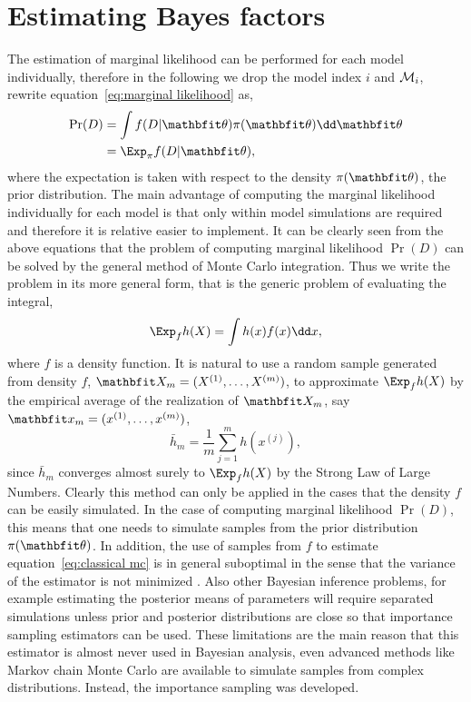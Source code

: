 \section{Estimating Bayes factors}
\label{sec:Estimating Bayes factors}

The estimation of marginal likelihood can be performed for each model
individually, therefore in the following we drop the model index $i$ and
$\mathcal{M}_i$, rewrite equation~\eqref{eq:marginal likelihood} as,
\begin{align}
  \Pr(D) & = \int f(D|\bth)\pi(\bth)\dd\bth \\
  & = \Exp_{\pi} f(D|\bth),
\end{align}
where the expectation is taken with respect to the density $\pi(\bth)$, the
prior distribution. The main advantage of computing the marginal likelihood
individually for each model is that only within model simulations are required
and therefore it is relative easier to implement. It can be clearly seen from
the above equations that the problem of computing marginal likelihood $\Pr(D)$
can be solved by the general method of Monte Carlo integration. Thus we write
the problem in its more general form, that is the generic problem of
evaluating the integral,
\begin{equation}
  \Exp_f h(X) = \int h(x) f(x)
  \dd x,
  \label{eq:classical mc}
\end{equation}
where $f$ is a density function. It is natural to use a random sample
generated from density $f$, $\bfX_m = (\mcvec{X}{m})$, to approximate $\Exp_f
h(X)$ by the empirical average of the realization of $\bfX_m$, say $\bfx_m =
(\mcvec{x}{m})$,
\begin{equation}
  \bar{h}_m = \frac{1}{m}\sum_{j=1}^m h(x^{(j)}),
  \label{eq:is convergence}
\end{equation}
since $\bar{h}_m$ converges almost surely to $\Exp_f h(X)$ by the Strong Law
of Large Numbers. Clearly this method can only be applied in the cases that
the density $f$ can be easily simulated. In the case of computing marginal
likelihood $\Pr(D)$, this means that one needs to simulate samples from the
prior distribution $\pi(\bth)$. In addition, the use of samples from $f$ to
estimate equation~\eqref{eq:classical mc} is in general suboptimal in the
sense that the variance of the estimator is not minimized
\parencite[see][sec.~3.3]{Robert2004}. Also other Bayesian inference problems,
for example estimating the posterior means of parameters will require
separated simulations unless prior and posterior distributions are close so
that importance sampling estimators can be used. These limitations are the
main reason that this estimator is almost never used in Bayesian analysis,
even advanced methods like Markov chain Monte Carlo are available to simulate
samples from complex distributions. Instead, the importance sampling was
developed.

